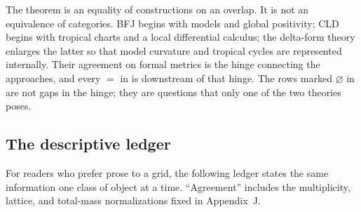 \begin{remark}
\label{rem:ch31-not-an-equivalence}
The theorem is an equality of constructions on an overlap.  It is not an
equivalence of categories.  BFJ begins with models and global positivity;
CLD begins with tropical charts and a local differential calculus; the
delta-form theory enlarges the latter so that model curvature and tropical
cycles are represented internally.  Their agreement on formal metrics is
the hinge connecting the approaches, and every \(=\) in
 is downstream of that hinge.  The rows marked
\(\varnothing\) in  are not gaps in the hinge;
they are questions that only one of the two theories poses.
\end{remark}

\subsection{The descriptive ledger}
\label{sec:ch31-ledger}

For readers who prefer prose to a grid, the following ledger states the same
information one class of object at a time.  ``Agreement'' includes the
multiplicity, lattice, and total-mass normalizations fixed in
Appendix~J.

